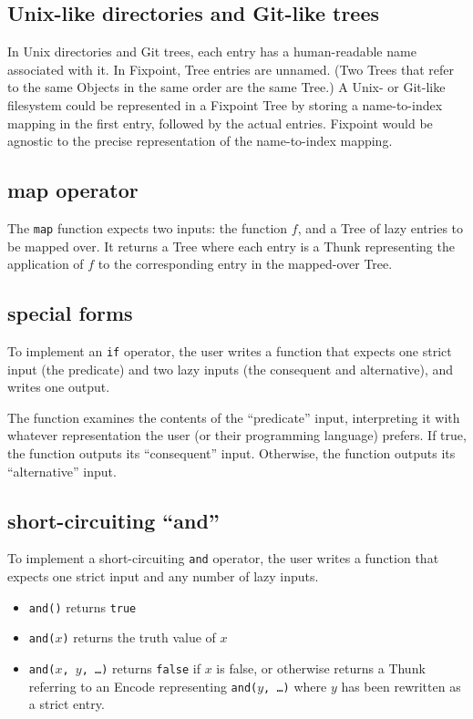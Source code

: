 \documentclass{article}
\newcommand{\objects}{\textrm{Object}s\xspace}
\newcommand{\encode}{\textrm{Encode}\xspace}
\newcommand{\thunk}{\textrm{Thunk}\xspace}
\newcommand{\tree}{\textrm{Tree}\xspace}
\newcommand{\trees}{\textrm{Tree}s\xspace}
\newcommand{\bs}{\vspace{\baselineskip}}
\begin{document}
\subsection{Unix-like directories and Git-like trees}

In Unix directories and Git trees, each entry has a human-readable
name associated with it. In Fixpoint, \tree entries are unnamed. (Two
\trees that refer to the same \objects in the same order are the same
\tree.) A Unix- or Git-like filesystem could be represented in a
Fixpoint \tree by storing a name-to-index mapping in the first entry,
followed by the actual entries. Fixpoint would be agnostic to the
precise representation of the name-to-index mapping.

\subsection{map operator} The \texttt{map} function expects
two inputs: the function $f$, and a \tree of lazy entries to be mapped
over. It returns a \tree where each entry is a \thunk representing the
application of $f$ to the corresponding entry in the mapped-over
\tree.

\subsection{special forms} To implement an \texttt{if}
operator, the user writes a function that expects one strict input
(the predicate) and two lazy inputs (the consequent and alternative),
and writes one output.

\bs

The function examines the contents of the ``predicate'' input,
interpreting it with whatever representation the user (or their
programming language) prefers. If true, the function outputs its
``consequent'' input. Otherwise, the function outputs its
``alternative'' input.

\subsection{short-circuiting ``and''} To implement a
short-circuiting \texttt{and} operator, the user writes a function
that expects one strict input and any number of lazy inputs.

\begin{itemize}[itemsep=0pt]
\item \texttt{and()} returns \texttt{true}
\item \texttt{and($x$)} returns the truth value of $x$
\item \texttt{and($x$, $y$, \ldots)} returns \texttt{false} if $x$ is false, or otherwise returns a \thunk referring to an 
\encode representing \texttt{and($y$, \ldots)} where $y$ has been rewritten as a strict entry.
\end{itemize}
\end{document}
